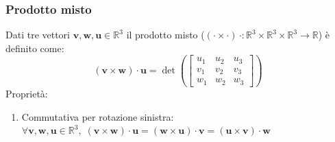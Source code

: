     \subsubsection{Prodotto misto} \label{subsubsec:vsmisc}
        Dati tre vettori $\mathbf{v}, \mathbf{w}, \mathbf{u} \in \mathbb{R}^3$ il prodotto misto ($(\cdot \times \cdot) \, \cdot : \mathbb{R}^3 \times \mathbb{R}^3 \times \mathbb{R}^3 \rightarrow \mathbb{R}$) è definito come:
        \[
            (\mathbf{v} \times \mathbf{w}) \cdot \mathbf{u} = \det \left(
            \begin{bmatrix}
                u_1 & u_2 & u_3 \\
                v_1 & v_2 & v_3 \\
                w_1 & w_2 & w_3
            \end{bmatrix}
            \right)
        \]
        Proprietà:
        \begin{enumerate}[label=(\arabic*)]
            \item Commutativa per rotazione sinistra: $\forall \mathbf{v}, \mathbf{w}, \mathbf{u} \in \mathbb{R}^3, \; (\mathbf{v} \times \mathbf{w}) \cdot \mathbf{u} = (\mathbf{w} \times \mathbf{u}) \cdot \mathbf{v} = (\mathbf{u} \times \mathbf{v}) \cdot \mathbf{w}$
        \end{enumerate}

